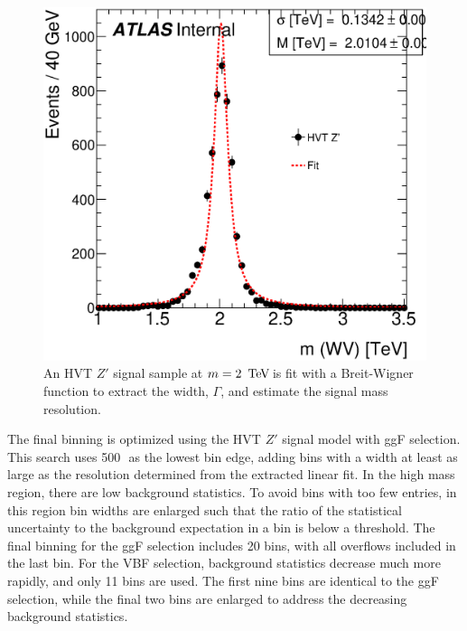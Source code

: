 \begin{figure}
\includegraphics[width=.99\linewidth]{figures/StatisticalAnalysis/fit_HVT_WW_15}
\caption[Extraction of signal mass resolution]{An HVT $Z'$ signal sample at $m=2\,\TeV$\,is fit with a Breit-Wigner function to extract the width, $\Gamma$, and estimate the signal mass resolution.}
\label{fig:sig_fit}
\end{figure}

The final binning is optimized using the HVT $Z'$ 
signal model with ggF selection. This search uses 500\,\GeV\, as the lowest bin edge, adding bins with a width at least as large as the resolution determined from the extracted linear fit. In the high mass region, there are low background statistics. To avoid bins with too few entries, in this region bin widths are enlarged such that the ratio of the statistical uncertainty to the background expectation in a bin is below a threshold. The final binning for the ggF selection includes 20 bins, with all overflows included in the last bin. For the VBF selection, background statistics decrease much more rapidly, and only 11 bins are used. The first nine bins are identical to the ggF selection, while the final two bins are enlarged to address the decreasing background statistics. 

